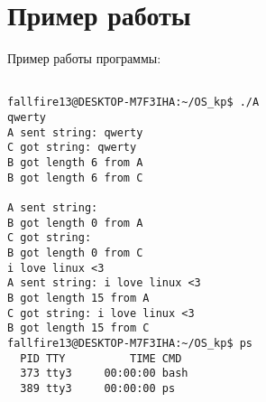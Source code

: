 \section{Пример работы}

Пример работы программы:

\begin{verbatim}

fallfire13@DESKTOP-M7F3IHA:~/OS_kp$ ./A
qwerty
A sent string: qwerty
C got string: qwerty
B got length 6 from A
B got length 6 from C

A sent string:
B got length 0 from A
C got string:
B got length 0 from C
i love linux <3
A sent string: i love linux <3
B got length 15 from A
C got string: i love linux <3
B got length 15 from C
fallfire13@DESKTOP-M7F3IHA:~/OS_kp$ ps
  PID TTY          TIME CMD
  373 tty3     00:00:00 bash
  389 tty3     00:00:00 ps


\end{verbatim}

\pagebreak


